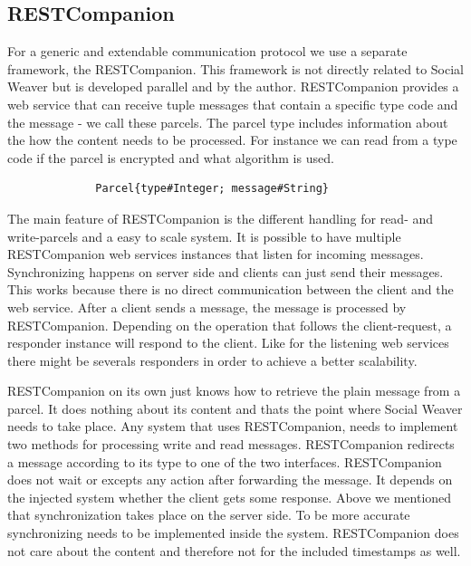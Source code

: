
\subsection{RESTCompanion}
For a generic and extendable communication protocol we use a separate framework, the RESTCompanion. This framework is not directly related to Social Weaver but is developed parallel and by the author. RESTCompanion provides a web service that can receive tuple messages that contain a specific type code and the message -  we call these parcels. The parcel type includes information about the how the content needs to be processed. For instance we can read from a type code if the parcel is encrypted and what algorithm is used. 

\begin{figure}[h!]
	\begin{verbatim}
		Parcel{type#Integer; message#String}
	\end{verbatim}
\end{figure}

The main feature of RESTCompanion is the different handling for read- and write-parcels and a easy to scale system. It is possible to have multiple RESTCompanion web services instances that listen for incoming messages. Synchronizing happens on server side and clients can just send their messages. This works because there is no direct communication between the client and the web service. After a client sends a message, the message is processed by RESTCompanion. Depending on the operation that follows the client-request, a responder instance will respond to the client. Like for the listening web services there might be severals responders in order to achieve a better scalability. 

RESTCompanion on its own just knows how to retrieve the plain message from a parcel. It does nothing about its content and thats the point where Social Weaver needs to take place. Any system that uses RESTCompanion, needs to implement two methods for processing write and read messages. RESTCompanion redirects a message according to its type to one of the two interfaces. RESTCompanion does not wait or excepts any action after forwarding the message. It depends on the injected system whether the client gets some response. Above we mentioned that synchronization takes place on the server side. To be more accurate synchronizing needs to be implemented inside the system. RESTCompanion does not care about the content and therefore not for the included timestamps as well. 

